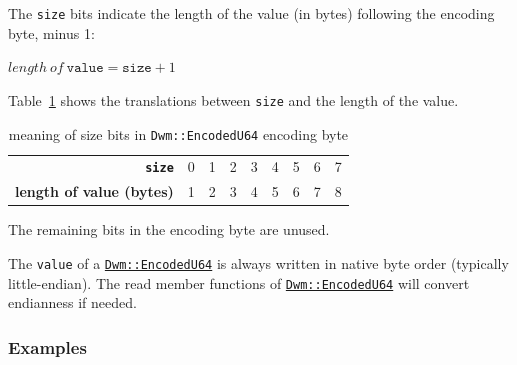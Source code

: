 The \texttt{size} bits indicate the length of the value (in bytes)
following the encoding byte, minus 1:

  $length\ of\ \texttt{value} = \texttt{size} + 1$

Table~\ref{table:EncodedU64SizeBits} shows the translations between
\texttt{size} and the length of the value.

\begin{table}[H]
\begin{center}
\begin{tabular}{r|l|l|l|l|l|l|l|l}
  \textbf{\texttt{size}} & 0 & 1 & 2 & 3 & 4 & 5 & 6 & 7 \\
  \textbf{length of value (bytes)} & 1 & 2 & 3 & 4 & 5 & 6 & 7 & 8 \\
\end{tabular}
\end{center}
\caption{meaning of size bits in \texttt{Dwm::EncodedU64} encoding byte}
\label{table:EncodedU64SizeBits}
\end{table}

The remaining bits in the encoding byte are unused.

The \texttt{value} of a
\hyperref[class:EncodedU64]{\texttt{Dwm::EncodedU64}} is always
written in native byte order (typically little-endian).  The read
member functions of
\hyperref[class:EncodedU64]{\texttt{Dwm::EncodedU64}} will convert
endianness if needed.

\subsubsection{Examples}
\begin{minipage}{\textwidth}
\end{minipage}

\begin{minipage}{\textwidth}
\end{minipage}

\begin{minipage}{\textwidth}
\end{minipage}

\begin{minipage}{\textwidth}
\end{minipage}

